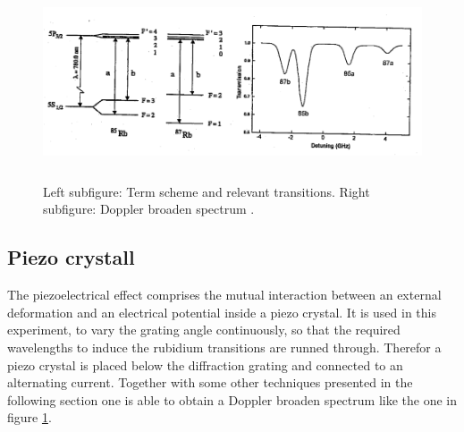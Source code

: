 \begin{figure}
  \centering
  \includegraphics[height=5.8cm]{Ordnername/dopplerandterm.png}
  \caption{Left subfigure: Term scheme and relevant transitions. Right subfigure: Doppler broaden spectrum \cite{manual}.}
  \label{fig:dopplerandterm}
\end{figure}

\subsection{Piezo crystall}

The piezoelectrical effect comprises the mutual interaction between an external deformation and an
electrical potential inside a piezo crystal. It is used in this experiment, to vary the grating
angle continuously, so that the required wavelengths to induce the rubidium transitions are runned through.
Therefor a piezo crystal is placed below the diffraction grating and connected to an alternating current.
Together with some other techniques presented in the following section one is able to obtain a
Doppler broaden spectrum like the one in figure \ref{fig:dopplerandterm}.

